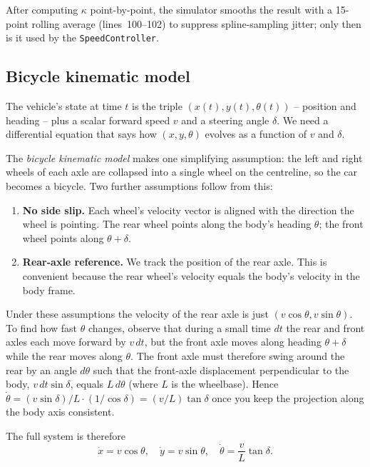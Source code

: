 After computing $\kappa$ point-by-point, the simulator smooths the
result with a 15-point rolling average (lines~100--102) to suppress
spline-sampling jitter; only then is it used by the
\texttt{SpeedController}.

\subsection{Bicycle kinematic model}

The vehicle's state at time $t$ is the triple $(x(t),y(t),\theta(t))$
-- position and heading -- plus a scalar forward speed $v$ and a
steering angle $\delta$. We need a differential equation that says how
$(x,y,\theta)$ evolves as a function of $v$ and $\delta$.

The \emph{bicycle kinematic model} makes one simplifying assumption:
the left and right wheels of each axle are collapsed into a single
wheel on the centreline, so the car becomes a bicycle. Two further
assumptions follow from this:
\begin{enumerate}[leftmargin=2em,itemsep=2pt]
  \item \textbf{No side slip.} Each wheel's velocity vector is aligned
        with the direction the wheel is pointing. The rear wheel
        points along the body's heading $\theta$; the front wheel
        points along $\theta+\delta$.
  \item \textbf{Rear-axle reference.} We track the position of the
        rear axle. This is convenient because the rear wheel's
        velocity equals the body's velocity in the body frame.
\end{enumerate}
Under these assumptions the velocity of the rear axle is just
$(v\cos\theta, v\sin\theta)$. To find how fast $\theta$ changes,
observe that during a small time $dt$ the rear and front axles each
move forward by $v\,dt$, but the front axle moves along heading
$\theta+\delta$ while the rear moves along $\theta$. The front axle
must therefore swing around the rear by an angle $d\theta$ such that
the front-axle displacement perpendicular to the body, $v\,dt\sin\delta$,
equals $L\,d\theta$ (where $L$ is the wheelbase). Hence
$\dot\theta = (v\sin\delta)/L\cdot(1/\cos\delta) = (v/L)\tan\delta$
once you keep the projection along the body axis consistent.

The full system is therefore
\begin{equation}
\dot x = v\cos\theta,\quad
\dot y = v\sin\theta,\quad
\dot\theta = \frac{v}{L}\tan\delta.
\label{eq:bicycle}
\end{equation}

